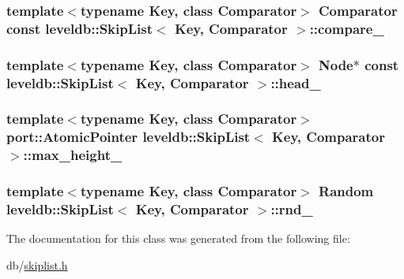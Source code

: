 \subsubsection[{compare\+\_\+}]{\setlength{\rightskip}{0pt plus 5cm}template$<$typename Key, class Comparator$>$ {\bf Comparator} const {\bf leveldb\+::\+Skip\+List}$<$ {\bf Key}, {\bf Comparator} $>$\+::compare\+\_\+\hspace{0.3cm}{\ttfamily [private]}}\label{classleveldb_1_1_skip_list_ab59a01d670b82316fd0532c17cb45a37}
\hypertarget{classleveldb_1_1_skip_list_abe0e7aa843a469bf63d1d1c9b64582f0}{}
\subsubsection[{head\+\_\+}]{\setlength{\rightskip}{0pt plus 5cm}template$<$typename Key, class Comparator$>$ {\bf Node}$\ast$ const {\bf leveldb\+::\+Skip\+List}$<$ {\bf Key}, {\bf Comparator} $>$\+::head\+\_\+\hspace{0.3cm}{\ttfamily [private]}}\label{classleveldb_1_1_skip_list_abe0e7aa843a469bf63d1d1c9b64582f0}
\hypertarget{classleveldb_1_1_skip_list_a08b97b9da8e1fd93d2c6ae4915dc132f}{}
\subsubsection[{max\+\_\+height\+\_\+}]{\setlength{\rightskip}{0pt plus 5cm}template$<$typename Key, class Comparator$>$ {\bf port\+::\+Atomic\+Pointer} {\bf leveldb\+::\+Skip\+List}$<$ {\bf Key}, {\bf Comparator} $>$\+::max\+\_\+height\+\_\+\hspace{0.3cm}{\ttfamily [private]}}\label{classleveldb_1_1_skip_list_a08b97b9da8e1fd93d2c6ae4915dc132f}
\hypertarget{classleveldb_1_1_skip_list_ae418eb7ce6b8e0a4ea95b8b782e02c9e}{}
\subsubsection[{rnd\+\_\+}]{\setlength{\rightskip}{0pt plus 5cm}template$<$typename Key, class Comparator$>$ {\bf Random} {\bf leveldb\+::\+Skip\+List}$<$ {\bf Key}, {\bf Comparator} $>$\+::rnd\+\_\+\hspace{0.3cm}{\ttfamily [private]}}\label{classleveldb_1_1_skip_list_ae418eb7ce6b8e0a4ea95b8b782e02c9e}


The documentation for this class was generated from the following file\+:\begin{DoxyCompactItemize}
\item 
db/\hyperlink{skiplist_8h}{skiplist.\+h}\end{DoxyCompactItemize}
